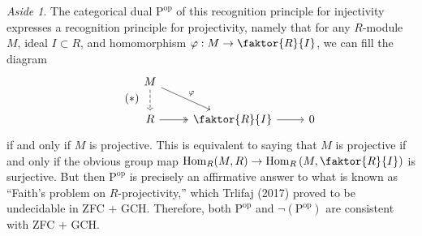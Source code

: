 \documentclass[10pt,letterpaper,cm]{nupset}
\theoremstyle{definition}
\theoremstyle{theorem}
\theoremstyle{remark}
\newtheorem*{aside}{Aside}
\newcommand{\1}{\mathbf{1}}
\newcommand{\0}{\vec 0}
\newcommand{\Rho}{\mathrm{P}}
\DeclareMathOperator{\op}{op}
\DeclareMathOperator{\Hom}{Hom}
\begin{document}
\begin{aside}
The categorical dual $\Rho^{\op}$ of this recognition principle for injectivity expresses a recognition principle for projectivity, namely that for any $R$-module $M$, ideal $I\subset R$, and homomorphism $\varphi : M \to \faktor{R}{I}$, we can fill the diagram
\[ \tag{$\ast$}
\begin{tikzcd}
M \arrow[rd, "\varphi"] \arrow[d, dashed] &  &  \\
R \arrow[r, two heads] & \faktor{R}{I} \arrow[r] & 0
\end{tikzcd}
\] if and only if $M$ is projective. This is equivalent to saying that $M$ is projective if and only if the obvious group map $\Hom_R(M, R) \to \Hom_R \left(M, \faktor{R}{I} \right)$ is surjective. 
But then $\Rho^{\op}$ is precisely an affirmative answer to what is known as ``Faith's problem on $R$-projectivity,'' which Trlifaj (2017) proved to be undecidable in ZFC + GCH. Therefore, both $\Rho^{\op}$ and $\neg (\Rho^{\op})$ are consistent with ZFC + GCH.
\end{aside}
\end{document}
